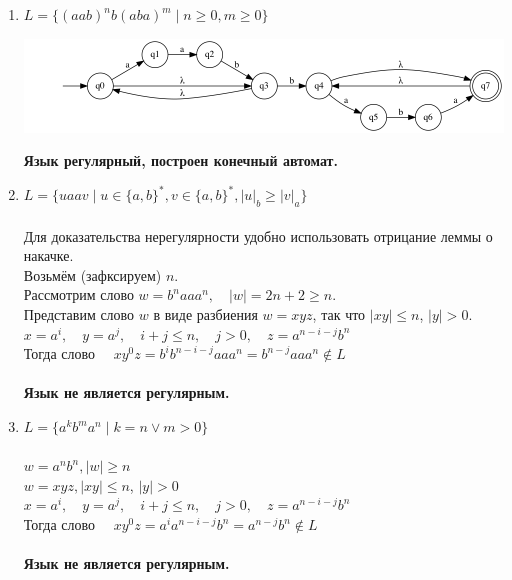\documentclass{article}
\begin{document}
\begin{enumerate}
    \item {$ L = \{(a a b)^{n} b(a b a)^{m} \mid n \ge 0, m \ge 0 \}$} \\
        \begin{center}
            \includegraphics[width=1\textwidth]{g41.png}
        \end{center}
        \textbf{Язык регулярный, построен конечный автомат.} \\

    \item {$L = \{{u a a v \mid u \in \{a, b\}^*, v \in \{a, b\}^*, |u|_b \ge |v|_a}\} $}\\ \\
        Для доказательства нерегулярности удобно использовать отрицание леммы о накачке. \\
        Возьмём (зафксируем) $n$. \\
        Рассмотрим слово $w = b^naaa^n, \quad |w| = 2n+2 \geq  n$. \\
        Представим слово $w$ в виде разбиения $w=xyz$, так что $|xy| \leq n$, $|y| > 0$. \\
        $x = a^i, \quad y = a^j,  \quad i+j \leq n, \quad j > 0, \quad z = a^{n-i-j}b^n$ \\
        Тогда слово $\quad x y^0 z = b^i b^{n-i-j} a a a^n = b^{n-j} a a a^n \notin L$ \\ \\
        \textbf{Язык не является регулярным.} \\
        
    \item {$ L = \{a^kb^ma^n \mid k = n \lor m > 0\} $}\\ \\
        $w = a^n b^n , |w| \geq n$ \\
        $w = xyz, |xy| \leq n$, $|y| > 0$ \\
        $x = a^i, \quad y = a^j, \quad i+j \leq n, \quad j > 0, \quad z = a^{n-i-j}b^n$ \\
        Тогда слово $\quad x y^0 z = a^i a^{n-i-j} b^n = a^{n-j} b^n \notin L$ \\ \\
        \textbf{Язык не является регулярным.} \\
        

\end{enumerate}
\end{document}
